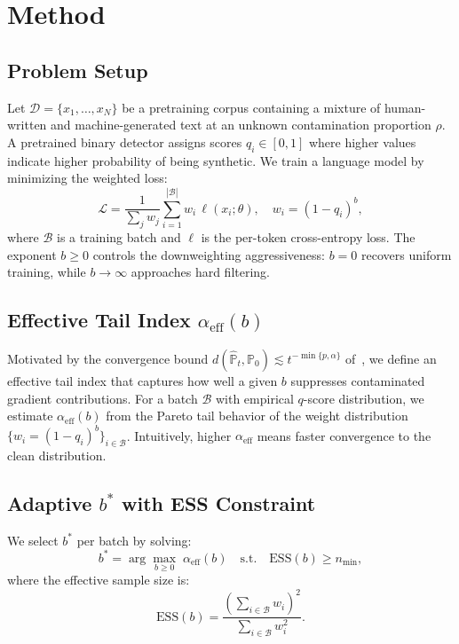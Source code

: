 \documentclass[11pt]{article}
\begin{document}
\section{Method}
\label{sec:method}

\subsection{Problem Setup}

Let $\mathcal{D} = \{x_1, \ldots, x_N\}$ be a pretraining corpus containing a mixture of human-written and machine-generated text at an unknown contamination proportion $\rho$. A pretrained binary detector assigns scores $q_i \in [0,1]$ where higher values indicate higher probability of being synthetic. We train a language model by minimizing the weighted loss:
\begin{equation}
    \mathcal{L} = \frac{1}{\sum_j w_j} \sum_{i=1}^{|\mathcal{B}|} w_i \, \ell(x_i; \theta), \quad w_i = (1 - q_i)^b,
\end{equation}
where $\mathcal{B}$ is a training batch and $\ell$ is the per-token cross-entropy loss. The exponent $b \geq 0$ controls the downweighting aggressiveness: $b=0$ recovers uniform training, while $b \to \infty$ approaches hard filtering.

\subsection{Effective Tail Index $\alpha_{\mathrm{eff}}(b)$}

Motivated by the convergence bound $d(\hat{\mathbb{P}}_t, \mathbb{P}_0) \lesssim t^{-\min\{p,\alpha\}}$ of~\citet{convergence2025}, we define an effective tail index that captures how well a given $b$ suppresses contaminated gradient contributions. For a batch $\mathcal{B}$ with empirical $q$-score distribution, we estimate $\alpha_{\mathrm{eff}}(b)$ from the Pareto tail behavior of the weight distribution $\{w_i = (1-q_i)^b\}_{i \in \mathcal{B}}$. Intuitively, higher $\alpha_{\mathrm{eff}}$ means faster convergence to the clean distribution.

\subsection{Adaptive $b^*$ with ESS Constraint}

We select $b^*$ per batch by solving:
\begin{equation}
    b^* = \arg\max_{b \geq 0} \; \alpha_{\mathrm{eff}}(b) \quad \text{s.t.} \quad \mathrm{ESS}(b) \geq n_{\min},
\end{equation}
where the effective sample size is:
\begin{equation}
    \mathrm{ESS}(b) = \frac{\left(\sum_{i \in \mathcal{B}} w_i\right)^2}{\sum_{i \in \mathcal{B}} w_i^2}.
\end{equation}
\end{document}
